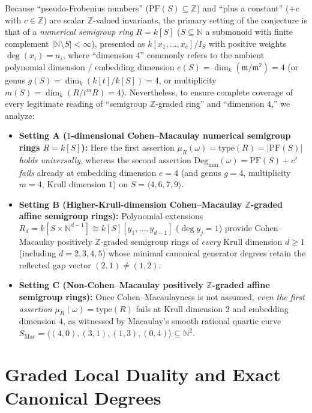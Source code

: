 \documentclass[11pt]{article}
\theoremstyle{definition}
\theoremstyle{remark}
\begin{document}
Because ``pseudo-Frobenius numbers'' ($\mathrm{PF}(S) \subseteq \mathbb{Z}$) and ``plus a constant'' ($+ c$ with $c \in \mathbb{Z}$) are scalar $\mathbb{Z}$-valued invariants, the primary setting of the conjecture is that of a \emph{numerical semigroup ring} $R = k[S]$ ($S \subseteq \mathbb{N}$ a submonoid with finite complement $|\mathbb{N} \setminus S| < \infty$), presented as $k[x_1, \dots, x_e]/I_S$ with positive weights $\deg(x_i) = n_i$, where ``dimension $4$'' commonly refers to the ambient polynomial dimension / embedding dimension $e(S) = \dim_k(\mathfrak{m}/\mathfrak{m}^2) = 4$ (or genus $g(S) = \dim_k(k[t]/k[S]) = 4$, or multiplicity $m(S) = \dim_k(R / t^m R) = 4$). Nevertheless, to ensure complete coverage of every legitimate reading of ``semigroup $\mathbb{Z}$-graded ring'' and ``dimension $4$,'' we analyze:
\begin{itemize}
  \item \textbf{Setting A ($1$-dimensional Cohen--Macaulay numerical semigroup rings $R = k[S]$):} Here the first assertion $\mu_R(\omega) = \mathrm{type}(R) = |\mathrm{PF}(S)|$ \emph{holds universally}, whereas the second assertion $\mathrm{Deg}_{\min}(\omega) = \mathrm{PF}(S) + c'$ \emph{fails} already at embedding dimension $e = 4$ (and genus $g = 4$, multiplicity $m = 4$, Krull dimension $1$) on $S = \langle 4, 6, 7, 9 \rangle$.
  \item \textbf{Setting B (Higher-Krull-dimension Cohen--Macaulay $\mathbb{Z}$-graded affine semigroup rings):} Polynomial extensions $R_d = k[S \times \mathbb{N}^{d-1}] \cong k[S][y_1, \dots, y_{d-1}]$ ($\deg y_j = 1$) provide Cohen--Macaulay positively $\mathbb{Z}$-graded semigroup rings of \emph{every} Krull dimension $d \ge 1$ (including $d = 2, 3, 4, 5$) whose minimal canonical generator degrees retain the reflected gap vector $(2, 1) \ne (1, 2)$.
  \item \textbf{Setting C (Non-Cohen--Macaulay positively $\mathbb{Z}$-graded affine semigroup rings):} Once Cohen--Macaulayness is not assumed, \emph{even the first assertion} $\mu_R(\omega) = \mathrm{type}(R)$ fails at Krull dimension $2$ and embedding dimension $4$, as witnessed by Macaulay's smooth rational quartic curve $S_{\mathrm{Mac}} = \langle (4,0), (3,1), (1,3), (0,4) \rangle \subseteq \mathbb{N}^2$.
\end{itemize}

\section{Graded Local Duality and Exact Canonical Degrees}
\end{document}
